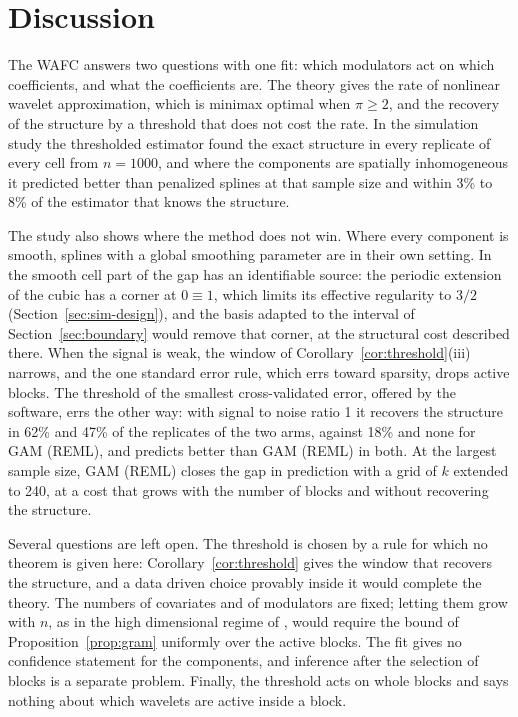 \section{Discussion}
\label{sec:discussion}

The WAFC answers two questions with one fit: which modulators act on which
coefficients, and what the coefficients are. The theory gives the rate of
nonlinear wavelet approximation, which is minimax optimal when $\pi \ge 2$,
and the recovery of the structure by a threshold that does not cost the rate.
In the simulation study the thresholded estimator found the exact structure in
every replicate of every cell from $n = 1000$, and where the components are
spatially inhomogeneous it predicted better than penalized splines at that
sample size and within 3\% to 8\% of the estimator that knows the structure.

The study also shows where the method does not win. Where every component is
smooth, splines with a global smoothing parameter are in their own setting.
In the smooth cell part of the gap has an identifiable source: the periodic
extension of the cubic has a corner at $0 \equiv 1$, which limits its
effective regularity to $3/2$ (Section~\ref{sec:sim-design}), and the basis
adapted to the interval of Section~\ref{sec:boundary} would remove that
corner, at the structural cost described there. When the signal is weak, the
window of Corollary~\ref{cor:threshold}(iii) narrows, and the one standard
error rule, which errs toward sparsity, drops active blocks. The threshold of
the smallest cross-validated error, offered by the software, errs the other
way: with signal to noise ratio 1 it recovers the structure in 62\% and 47\%
of the replicates of the two arms, against 18\% and none for GAM (REML), and
predicts better than GAM (REML) in both. At the largest sample size, GAM
(REML) closes the gap in prediction with a grid of $k$ extended to 240, at a
cost that grows with the number of blocks and without recovering the
structure.

Several questions are left open. The threshold is chosen by a rule for which
no theorem is given here: Corollary~\ref{cor:threshold} gives the window that
recovers the structure, and a data driven choice provably inside it would
complete the theory. The numbers of covariates and of modulators are fixed;
letting them grow with $n$, as in the high dimensional regime of
\citet{Klopp-Pensky-2015}, would require the bound of
Proposition~\ref{prop:gram} uniformly over the active blocks. The fit gives
no confidence statement for the components, and inference after the
selection of blocks is a separate problem. Finally, the threshold acts on
whole blocks and says nothing about which wavelets are active inside a block.


